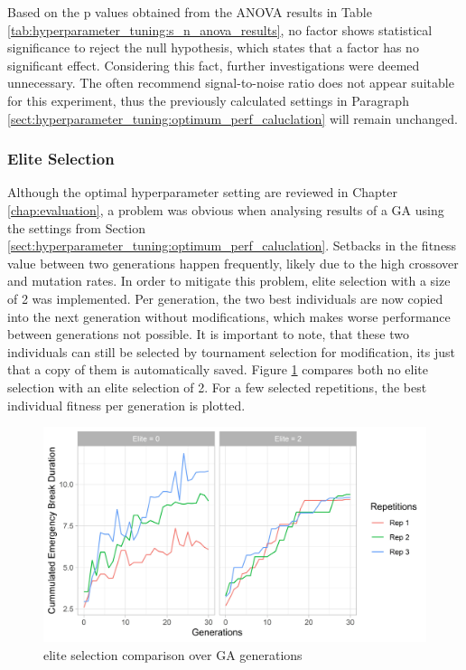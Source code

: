 Based on the p values obtained from the ANOVA results in Table \ref{tab:hyperparameter_tuning:s_n_anova_results}, no factor shows statistical significance to reject the null hypothesis, which states that a factor has no significant effect. Considering this fact, further investigations were deemed unnecessary. The often recommend signal-to-noise ratio does not appear suitable for this experiment, thus the previously calculated settings in Paragraph \ref{sect:hyperparameter_tuning:optimum_perf_caluclation} will remain unchanged.

\subsubsection{Elite Selection}
Although the optimal hyperparameter setting are reviewed in Chapter \ref{chap:evaluation}, a problem was obvious when analysing results of a GA using the settings from Section \ref{sect:hyperparameter_tuning:optimum_perf_caluclation}. Setbacks in the fitness value between two generations happen frequently, likely due to the high crossover and mutation rates. In order to mitigate this problem, elite selection with a size of 2 was implemented. Per generation, the two best individuals are now copied into the next generation without modifications, which makes worse performance between generations not possible. It is important to note, that these two individuals can still be selected by tournament selection for modification, its just that a copy of them is automatically saved. Figure \ref{fig:hyperparameter_tuning:elite_no_elite_comp} compares both no elite selection with an elite selection of 2. For a few selected repetitions, the best individual fitness per generation is plotted.

\begin{figure}[ht] 
	\includegraphics[width=1\linewidth]{simulations/evaluation/plots/elite_vs_no_elite_generations}
	\caption{elite selection comparison over GA generations}
	\label{fig:hyperparameter_tuning:elite_no_elite_comp}
\end{figure}

